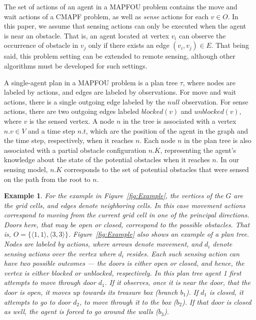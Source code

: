 \documentclass[letterpaper]{article} %
\newcommand{\blocked}{\textit{blocked}}
\newcommand{\unblocked}{\textit{unblocked}}
\newcommand{\roni}[1]{{\textcolor{green}{[Roni: #1]}}}
\newtheorem{exmp}{Example}
\begin{document}
The set of actions of an agent in a MAPFOU problem contains the move and wait actions of a CMAPF problem, as well as \emph{sense} actions for each $v \in O$. 
In this paper, we assume that sensing actions can only be executed when the agent is near an obstacle. That is, an agent located at vertex $v_i$ can observe the occurrence of obstacle in $v_j$ only if there exists an edge $(v_i, v_j) \in E$. That being said, this problem setting can be extended to remote sensing, although other algorithms must be developed for such settings.

A single-agent plan in a MAPFOU problem is a plan tree $\tau$, where nodes are labeled by actions, and edges are labeled by observations. For move and wait actions, there is a single outgoing edge labeled by the $null$ observation. For sense actions, there are two outgoing edges labeled $\blocked(v)$ and $\unblocked(v)$, where $v$ is the sensed vertex. 
A node $n$ in the tree is associated with a vertex $n.v \in V$ and a time step $n.t$, which are the position of the agent in the graph and the time step, respectively, when it reaches $n$. 
Each node $n$ in the plan tree is also associated with a partial obstacle configuration $n.K$, representing the agent's knowledge about the state of the potential obstacles when it reaches $n$. In our sensing model, $n.K$ corresponds to the set of potential obstacles that were sensed on the path from the root to $n$. 

\begin{exmp}
For the example in Figure~\ref{fig:Example}, the vertices of the $G$ are the grid cells, and edges denote neighboring cells. In this case movement actions correspond to moving from the current grid cell in one of the principal directions. 
Doors here, that may be open or closed, correspond to the possible obstacles. That is, $O=\{ \langle 1,1 \rangle, \langle 3,3 \rangle \}$. 
Figure~\ref{fig:Example} also shows an example of a plan tree. Nodes are labeled by actions, where arrows denote movement, and $d_i$ denote sensing actions over the vertex where $d_i$ resides. Each such sensing action can have two possible outcomes --- the doors is either open or closed, and hence, the vertex is either blocked or unblocked, respectively.
In this plan tree agent 1 first attempts to move through door $d_1$. If it observes, once it is near the door, that the door is open, it moves up towards its treasure box (branch $b_1$). If $d_1$ is closed, it attempts to go to door $d_2$, to move through it to the box ($b_2$). If that door is closed as well, the agent is forced to go around the walls ($b_3$).  
\end{exmp}
\end{document}
